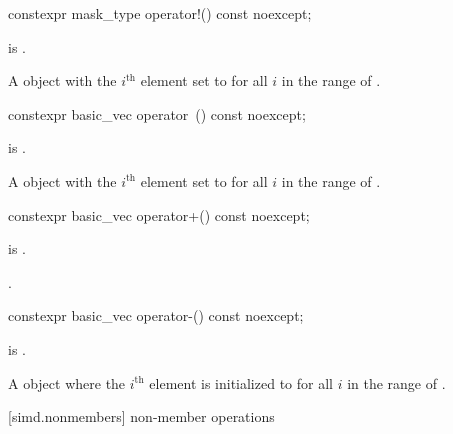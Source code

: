 \begin{itemdecl}
constexpr mask_type operator!() const noexcept;
\end{itemdecl}

\begin{itemdescr}
\pnum
\constraints
{} is .

\pnum
\returns
A  object with the $i^\text{th}$ element set to
 for all $i$ in the range of .
\end{itemdescr}

\begin{itemdecl}
constexpr basic_vec operator~() const noexcept;
\end{itemdecl}

\begin{itemdescr}
\pnum
\constraints
{} is .

\pnum
\returns
A  object with the $i^\text{th}$ element set to
 for all $i$ in the range of .
\end{itemdescr}

\begin{itemdecl}
constexpr basic_vec operator+() const noexcept;
\end{itemdecl}

\begin{itemdescr}
\pnum
\constraints
{} is .

\pnum
\returns
{}.
\end{itemdescr}

\begin{itemdecl}
constexpr basic_vec operator-() const noexcept;
\end{itemdecl}

\begin{itemdescr}
\pnum
\constraints
{} is .

\pnum
\returns
A  object where the $i^\text{th}$ element is initialized to
 for all $i$ in the range of .
\end{itemdescr}

[simd.nonmembers]{ non-member operations}


